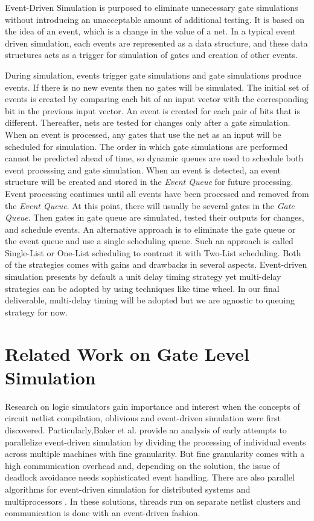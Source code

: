 \documentclass[a4paper,onesided,12pt]{report}
\begin{document}
 Event-Driven Simulation is purposed to eliminate unnecessary gate simulations
 without introducing an unacceptable amount of additional testing. It is based on the idea of an event, which is a change in the value of a net. In a typical event driven simulation, each events are represented as a data structure,
 and these data structures acts as a trigger for simulation of gates and  creation of other events.
 
 During simulation, events trigger gate simulations and gate simulations produce
 events. If there is no new events then no gates will be simulated. The initial set of events is created by comparing each bit of an input vector with the corresponding bit in the previous input vector. An event is created for each pair of bits that is different. Thereafter, nets are tested for changes only after a gate simulation. When an event is processed, any gates that use the net as an input will be scheduled for simulation. The order in which gate simulations are performed cannot be predicted ahead of time, so dynamic queues are used to schedule both event processing and gate simulation. When an event is detected, an event structure will be created and stored in the \emph{Event
 Queue} for future processing. Event processing continues until all events have been processed and removed from the \emph{Event Queue}. At this point, there will usually be several gates in the \emph{Gate Queue}. Then gates in gate queue are simulated, tested their outputs for changes, and schedule events. An alternative approach is to eliminate the gate queue or the event queue and use a single scheduling queue. Such an approach is called Single-List or One-List scheduling to contrast it with Two-List scheduling. Both of the strategies comes with gains and drawbacks in several aspects. Event-driven simulation presents by default a unit delay timing strategy yet multi-delay strategies can be adopted by using techniques like time wheel. In our final deliverable, multi-delay timing will be adopted but we are agnostic to queuing strategy for now.
 
 
   
 
 \chapter{Related Work on Gate Level Simulation}
 \label{chapter:related-work}
 
Research on logic simulators gain importance and interest when the
concepts of circuit netlist compilation, oblivious and event-driven
simulation were first discovered. Particularly,Baker et al.\cite{baker} provide
an analysis of early attempts to parallelize event-driven
simulation by dividing the processing of individual events
across multiple machines with fine granularity. But fine granularity
comes with a high communication overhead and, depending
on the solution, the issue of deadlock avoidance needs sophisticated
event handling. There are also parallel algorithms for event-driven simulation
for distributed systems \cite{manjikian,matsumoto} and multiprocessors
\cite{kim}. In these solutions, threads run on separate netlist clusters and communication is done with an event-driven fashion.  
\end{document}
